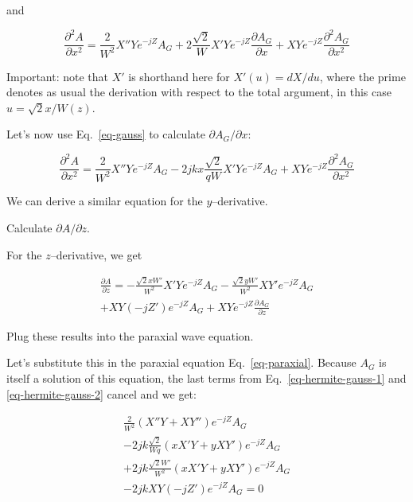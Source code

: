 and

\begin{equation}
\frac{\partial^2 A}{\partial x^2} = \frac{2}{W^2}X''Ye^{-jZ} A_G  + 2\frac{\sqrt{2}}{W}X'Ye^{-jZ} \frac{\partial A_G}{\partial x}  + XYe^{-jZ} \frac{\partial^2 A_G}{\partial x^2}
\end{equation} 

Important: note that $X'$ is shorthand here for $X'(u)=dX/du$, where the prime denotes as usual the derivation with respect to the total argument, in this case $u=\sqrt{2}x/W(z)$.

Let's now use Eq.~\ref{eq-gauss} to calculate $\partial A_G / \partial x$:

\begin{equation}
\frac{\partial^2 A}{\partial x^2} = \frac{2}{W^2}X''Ye^{-jZ} A_G  - 2j k x \frac{\sqrt{2}}{qW}X'Ye^{-jZ}A_G  + XYe^{-jZ} \frac{\partial^2 A_G}{\partial x^2} \label{eq-hermite-gauss-1}
\end{equation} 

We can derive a similar equation for the $y$--derivative.

\begin{cue}
Calculate $\partial A / \partial z$.
\end{cue}

For the $z$--derivative, we get

\begin{align}
\frac{\partial A}{\partial z} =  -\frac{\sqrt{2}x W'}{W^2}X'Ye^{-jZ} A_G -\frac{\sqrt{2}y W'}{W^2}XY'e^{-jZ} A_G \nonumber \\ 
+ XY\left(-jZ'\right)e^{-jZ} A_G + XYe^{-jZ}\frac{\partial A_G}{\partial z} \label{eq-hermite-gauss-2}
\end{align} 

\begin{cue}
Plug these results into the paraxial wave equation.
\end{cue}

Let's substitute this in the paraxial equation Eq.~\ref{eq-paraxial}. Because $A_G$ is itself a solution of this equation, the last terms from Eq.~\ref{eq-hermite-gauss-1} and \ref{eq-hermite-gauss-2} cancel and we get:

\begin{align}
\frac{2}{W^2}\left(X''Y+XY''\right)e^{-jZ} A_G  \nonumber \\
-2jk \frac{\sqrt{2}}{Wq}\left(xX'Y+yXY'\right)e^{-jZ}A_G \nonumber \\
+2jk \frac{\sqrt{2} W'}{W^2}\left(xX'Y+yXY'\right)e^{-jZ}A_G \nonumber \\
-2jk XY\left(-jZ'\right)e^{-jZ} A_G = 0
\end{align}

